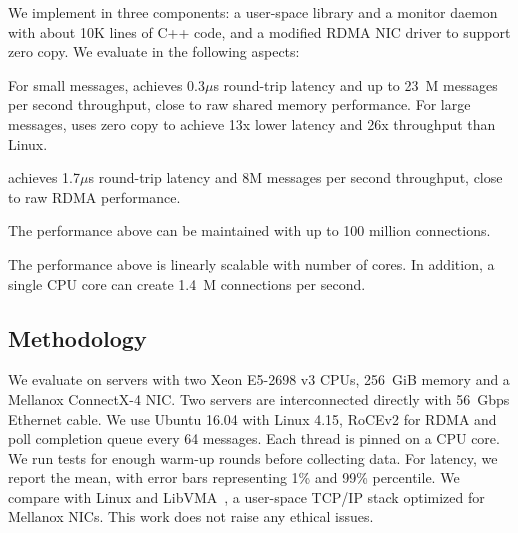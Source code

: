 
We implement \sys in three components: a user-space library \libipc{} and a monitor daemon with about 10K lines of C++ code, and a modified RDMA NIC driver to support zero copy.
We evaluate \sys in the following aspects:

For small messages, \sys achieves 0.3$\mu$s round-trip latency and up to 23~M messages per second throughput, close to raw shared memory performance. For large messages, \sys uses zero copy to achieve 13x lower latency and 26x throughput than Linux.

\sys achieves  1.7$\mu$s round-trip latency and 8M messages per second throughput, close to raw RDMA performance.

The performance above can be maintained with up to 100 million connections.

The performance above is linearly scalable with number of cores. In addition, a single CPU core can create 1.4~M connections per second.





\subsection{Methodology}
\label{subsec:methodology}

We evaluate \sys on servers with two Xeon E5-2698 v3 CPUs, 256~GiB memory and a Mellanox ConnectX-4 NIC. Two servers are interconnected directly with 56~Gbps Ethernet cable. We use Ubuntu 16.04 with Linux 4.15, RoCEv2 for RDMA and poll completion queue every 64 messages.
Each thread is pinned on a CPU core. We run tests for enough warm-up rounds before collecting data. For latency, we report the mean, with error bars representing 1\% and 99\% percentile.
We compare with Linux and LibVMA~\cite{libvma}, a user-space TCP/IP stack optimized for Mellanox NICs.
This work does not raise any ethical issues.

